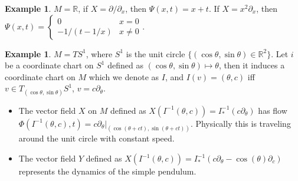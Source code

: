 \documentclass{article}
\theoremstyle{definition}
\newtheorem{exm}[thm]{Example}
\begin{document}
\begin{exm}
    $M=\mathbb{R}$, if $X=\partial/\partial_x$, then $\Psi(x, t)=x+t$. If $X=x^2\partial_x$, then $\Psi(x, t)=\begin{cases} 0 & x=0\\ -1/(t-1/x) & x\not=0\end{cases}$.
\end{exm}

\begin{exm}\label{pen} $M=TS^1$, where $S^1$ is the unit circle $\{(\cos\theta, \sin\theta)\in \mathbb{R}^2\}$. Let $i$ be a coordinate chart on $S^1$ defined as $(\cos\theta, \sin\theta)\mapsto \theta$, then it induces a coordinate chart on $M$ which we denote as $I$, and $I(v)=(\theta, c)$ iff $v\in T_{(\cos\theta, \sin\theta)}S^1$, $v=c\partial_\theta$. 
\begin{itemize}
    \item The vector field $X$ on $M$ defined as $X(I^{-1}(\theta, c))=I^{-1}_*(c\partial_\theta)$ has flow $\Phi(I^{-1}(\theta, c), t)=c\partial_\theta|_{(\cos(\theta+ct), \sin(\theta+ct))}$. Physically this is traveling around the unit circle with constant speed.
    \item The vector field $Y$ defined as $X(I^{-1}(\theta, c))=I^{-1}_*(c\partial_\theta-\cos(\theta)\partial_c)$ represents the dynamics of the simple pendulum.
\end{itemize}    
\end{exm}
\end{document}
